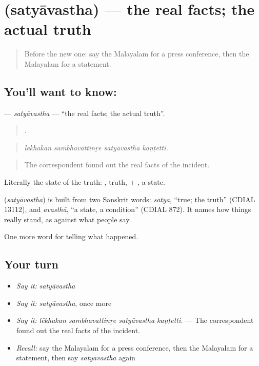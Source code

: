 \section[\texorpdfstring{\ml{സത്യാവസ്ഥ} (satyāvastha)}{സത്യാവസ്ഥ (satyāvastha)}]{ (satyāvastha) — the real facts; the actual truth}

\label{lesson:ML-C352-satyavastha}



\begin{quote}
Before the new one: say the Malayalam for a press conference, then the Malayalam for a statement.
\end{quote}

\subsection*{You'll want to know: }
\textbf{} — \emph{satyāvastha} — \textquotedblleft{}the real facts; the actual truth\textquotedblright{}.

\begin{quote}
   .
\end{quote}

\begin{quote}
\emph{lēkhakan sambhavattinṟe satyāvastha kaṇṭetti.}
\end{quote}

\begin{quote}
The correspondent found out the real facts of the incident.
\end{quote}

Literally the state of the truth: , truth, + , a state.

\begin{cousinweb}
\textbf{} (\emph{satyāvastha}) is built from two Sanskrit words: \emph{satya}, \textquotedblleft{}true; the truth\textquotedblright{} (CDIAL 13112), and \emph{avasthā}, \textquotedblleft{}a state, a condition\textquotedblright{} (CDIAL 872). It names how things really stand, as against what people say.
\end{cousinweb}

\begin{grammarlens}[title={What you've built}]
One more word for telling what happened.
\end{grammarlens}

\subsection*{Your turn}
\begin{itemize}
\raggedright
  \item \emph{Say it:} \emph{satyāvastha}
  \item \emph{Say it:} \emph{satyāvastha}, once more
  \item \emph{Say it:} \emph{lēkhakan sambhavattinṟe satyāvastha kaṇṭetti.} — The correspondent found out the real facts of the incident.
  \item \emph{Recall:} say the Malayalam for a press conference, then the Malayalam for a statement, then say \emph{satyāvastha} again
\end{itemize}

